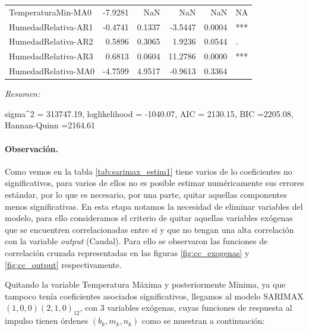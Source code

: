 \documentclass[12pt,oneside]{book}\usepackage[]{graphicx}\usepackage[]{color}
\newenvironment{knitrout}{}{} %
\theoremstyle{definition} %
\begin{document}
\begin{knitrout}
\begin{table}
\begin{threeparttable}
\begin{tabular}[t]{lrrrrl}
TemperaturaMin-MA0 & -7.9281 & NaN & NaN & NaN & NA\\
\addlinespace
\rowcolor{gray!6}  HumedadRelativa-AR1 & -0.4741 & 0.1337 & -3.5447 & 0.0004 & ***\\
HumedadRelativa-AR2 & 0.5896 & 0.3065 & 1.9236 & 0.0544 & .\\
\rowcolor{gray!6}  HumedadRelativa-AR3 & 0.6813 & 0.0604 & 11.2786 & 0.0000 & ***\\
HumedadRelativa-MA0 & -4.7599 & 4.9517 & -0.9613 & 0.3364 & \\
\bottomrule
\end{tabular}
\begin{tablenotes}
\item \textit{Resumen:} 
\item sigma\textasciicircum{}2 = 313747.19, loglikelihood = -1040.07, AIC = 2130.15, BIC =2205.08, Hannan-Quinn =2164.61
\end{tablenotes}
\end{threeparttable}
\end{table}


\end{knitrout}







\paragraph{Observación.} Como vemos en la tabla \ref{tab:sarimax_estim1} tiene varios de lo coeficientes no significativos, para varios de ellos no es posible estimar numéricamente sus errores estándar, por lo que es necesario, por una parte, quitar aquellas componentes menos significativas.  En esta etapa notamos la necesidad de eliminar variables del modelo, para ello consideramos el criterio de quitar aquellas variables exógenas que se encuentren correlacionadas entre si y que no tengan una alta correlación con la variable \textit{output} (Caudal). Para ello se observaron las funciones de correlación cruzada representadas en las figuras \ref{fig:cc_exogenas} y \ref{fig:cc_output} respectivamente.




Quitando la variable Temperatura Máxima y posteriormente Mínima, ya que tampoco tenía coeficientes asociados significativos, llegamos al modelo SARIMAX $(1,0,0)(2,1,0)_{12}$, con 3 variables exógenas, cuyas funciones de respuesta al impulso tienen órdenes $(b_k,m_k,n_k)$ como se muestran a continuación:
\end{document}
